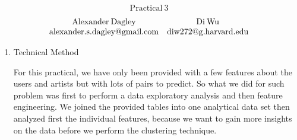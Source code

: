 \documentclass[12pt]{article}
\newcommand\tab[1][0.5cm]{\hspace*{#1}}
\begin{document}
\begin{align*}
\mathrm{Practical \:3}
\end{align*}
$$
\begin{array}{c  c  c}
\mathrm{Alexander \: Dagley} & \mathrm{Di \: Wu} \\
\mathrm{alexander.s.dagley@gmail.com} & \mathrm{diw272@g.harvard.edu}\\
\end{array}
$$

\begin{enumerate}
\item
Technical Method

\tab For this practical, we have only been provided with a few features about the users and artists but with lots of pairs to predict. So what we did for such problem was first to perform a data exploratory analysis and then feature engineering. We joined the provided tables into one analytical data set then analyzed first the individual features, because we want to gain more insights on the data before we perform the clustering technique. 


\end{enumerate}
\end{document}
